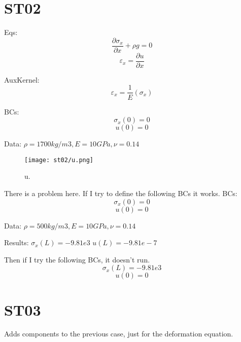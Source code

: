 \documentclass[11pt,letterpaper]{article}
\begin{document}
\section{ST02}

Eqs:
\begin{equation}
\frac{\partial \sigma_x}{\partial x} + \rho g = 0
\end{equation}
\begin{equation}
\varepsilon_x = \frac{\partial u}{\partial x}
\end{equation}

AuxKernel:
\begin{equation}
\varepsilon_x = \frac{1}{E}(\sigma_x)
\end{equation}

BCs:
\begin{equation}
\sigma_x (0) = 0
\end{equation}
\begin{equation}
u (0) = 0
\end{equation}

Data: $\rho = 1700 kg/m3, E = 10 GPa, \nu = 0.14$

\begin{figure*}[!h]
	\centering
	\texttt{[image: st02/u.png]}
	\hfill
	\caption{u.}
	\label{fig:st02}
\end{figure*}

There is a problem here. If I try to define the following BCs it works.
BCs:
\begin{equation}
\sigma_x (0) = 0
\end{equation}
\begin{equation}
u (0) = 0
\end{equation}

Data: $\rho = 500 kg/m3, E = 10 GPa, \nu = 0.14$

Results:
$ \sigma_x (L) = -9.81e3$
$ u(L) = -9.81e-7$

Then if I try the following BCs, it doesn't run.
\begin{equation}
\sigma_x (L) = -9.81e3
\end{equation}
\begin{equation}
u (0) = 0
\end{equation}

\section{ST03}

Adds components to the previous case, just for the deformation equation.
\end{document}
